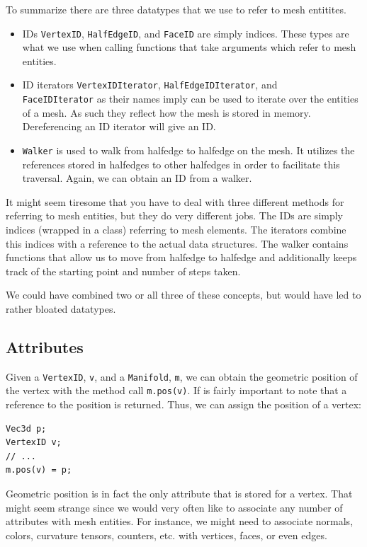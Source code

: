 \documentclass[a4paper]{article}
\begin{document}
To summarize there are three datatypes that we use to refer to mesh entitites.
\begin{itemize}
\item IDs \texttt{VertexID}, \texttt{HalfEdgeID}, and \texttt{FaceID} are simply indices. These types are what we use when calling functions that take arguments which refer to mesh entities. 
\item ID iterators \texttt{VertexIDIterator}, \texttt{HalfEdgeIDIterator}, and\\ \texttt{FaceIDIterator} as their names imply can be used to iterate over the entities of a mesh. As such they reflect how the mesh is stored in memory. Dereferencing an ID iterator will give an ID. 
\item \texttt{Walker} is used to walk from halfedge to halfedge on the mesh. It utilizes the references stored in halfedges to other halfedges in order to facilitate this traversal. Again, we can obtain an ID from a walker.
\end{itemize}
It might seem tiresome that you have to deal with three different methods for referring to mesh entities, but they do very different jobs. The IDs are simply indices (wrapped in a class) referring to mesh elements. The iterators combine this indices with a reference to the actual data structures. The walker contains functions that allow us to move from halfedge to halfedge and additionally keeps track of the starting point and number of steps taken.

We could have combined two or all three of these concepts, but would have led to rather bloated datatypes.

\subsection{Attributes}
Given a \texttt{VertexID},  \texttt{v}, and a \texttt{Manifold}, \texttt{m}, we can obtain the geometric position of the vertex with the method call \texttt{m.pos(v)}. If is fairly important to note that a reference to the position is returned. Thus, we can assign the position of a vertex:
\begin{verbatim}
Vec3d p;
VertexID v;
// ...
m.pos(v) = p;
\end{verbatim}

Geometric position is in fact the only attribute that is stored for a vertex. That might seem strange since we would very often like to associate any number of attributes with mesh entities. For instance, we might need to associate normals, colors, curvature tensors, counters, etc. with vertices, faces, or even edges.
\end{document}
